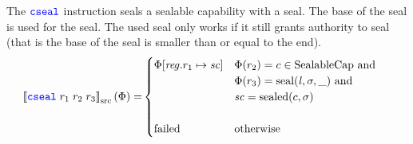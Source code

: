 \documentclass[a4paper]{article}
\newcommand{\sem}[1]{\left\llbracket #1 \right\rrbracket}
\newcommand{\ssem}[2][\Phi]{\sem{#2}_{\mathrm{src}}(#1)}
\newcommand{\sourcecolor}[1]{\color{blue}}
\newcommand{\src}[1]{{\sourcecolor{} #1}}
\newcommand{\zinstr}[1]{\texttt{#1}}
\newcommand{\threeinstr}[4]{
  \ifthenelse{\equal{#2#3#4}{}}
  {\zinstr{#1}}
  {\zinstr{#1} \; #2 \; #3 \; #4}
}
\newcommand{\scseal}[3]{\threeinstr{\src{cseal}}{#1}{#2}{#3}}
\newcommand{\update}[2]{[#1 \mapsto #2]}
\newcommand{\updReg}[2]{\update{\reg.#1}{#2}}
\newcommand{\shareddom}[1]{\mathrm{#1}}
\newcommand{\SealableCaps}{\shareddom{SealableCap}}
\newcommand{\lin}{\var{l}}
\newcommand{\seal}[1]{\shareddom{seal}(#1)}
\newcommand{\sealed}[1]{\shareddom{sealed}(#1)}
\newcommand{\failed}{\mathrm{failed}}
\newcommand{\var}[1]{\mathit{#1}}
\newcommand{\reg}{\var{reg}}
\newcommand{\vsc}{\var{sc}}
\begin{document}
The $\scseal{}{}{}$ instruction seals a sealable capability with a seal. The base of the seal is used for the seal. The used seal only works if it still grants authority to seal (that is the base of the seal is smaller than or equal to the end).
\begin{align*}
  \ssem{\scseal{r_1}{r_2}{r_3}} = & 
                                    \begin{cases}
                                      \Phi\updReg{r_1}{\vsc} & 
                                      \arraycolsep=0pt
                                      \begin{array}[t]{l}
                                        \Phi(r_2) = c \in \SealableCaps \text{ and } \\
                                        \Phi(r_3) = \seal{\lin,\sigma,\_} \text{ and } \\
                                        \vsc = \sealed{c,\sigma}
                                      \end{array}\\
                                      & \\
                                      \failed & \text{otherwise}
                                    \end{cases}
\end{align*}
\end{document}
